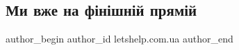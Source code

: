  
 
 
 
 

\subsection{Ми вже на фінішній прямій}
\label{sec:31_08_2023.fb.letshelp.com.ua.1.my_vzhe_na_finishnij_prjamij}

\ifcmt
 author_begin
   author_id letshelp.com.ua
 author_end
\fi
